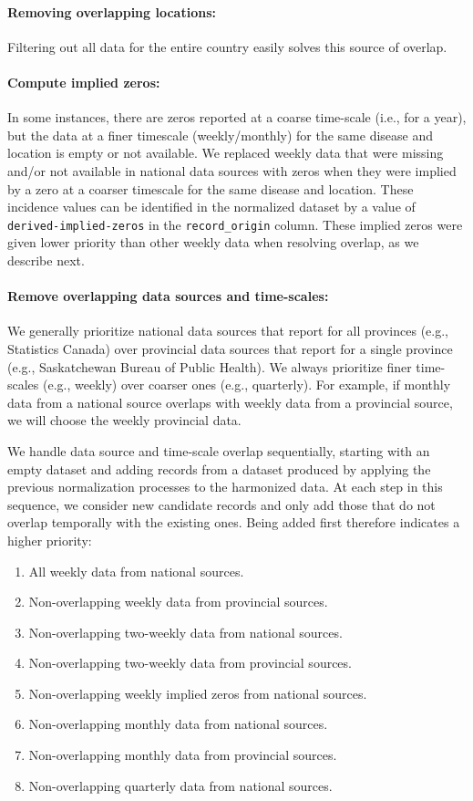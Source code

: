 \documentclass[12pt]{article}
\begin{document}
\paragraph{Removing overlapping locations:} Filtering out all data for the entire country easily solves this source of overlap.

\paragraph{Compute implied zeros:} In some instances, there are zeros reported at a coarse time-scale (i.e., for a year), but the data at a finer timescale (weekly/monthly) for the same disease and location is empty or not available. We replaced weekly data that were missing and/or not available in national data sources with zeros when they were implied by a zero at a coarser timescale for the same disease and location. These incidence values can be identified in the normalized dataset by a value of \texttt{derived-implied-zeros} in the \texttt{record\_origin} column. These implied zeros were given lower priority than other weekly data when resolving overlap, as we describe next.

\paragraph{Remove overlapping data sources and time-scales:} We generally prioritize national data sources that report for all provinces (e.g., Statistics Canada) over provincial data sources that report for a single province (e.g., Saskatchewan Bureau of Public Health). We always prioritize finer time-scales (e.g., weekly) over coarser ones (e.g., quarterly). For example, if monthly data from a national source overlaps with weekly data from a provincial source, we will choose the weekly provincial data.

We handle data source and time-scale overlap sequentially, starting with an empty dataset and adding records from a dataset produced by applying the previous normalization processes to the harmonized data. At each step in this sequence, we consider new candidate records and only add those that do not overlap temporally with the existing ones. Being added first therefore indicates a higher priority:
\begin{enumerate}
  \item All weekly data from national sources.
  \item Non-overlapping weekly data from provincial sources.
  \item Non-overlapping two-weekly data from national sources.
  \item Non-overlapping two-weekly data from provincial sources.
  \item Non-overlapping weekly implied zeros from national sources.
  \item Non-overlapping monthly data from national sources.
  \item Non-overlapping monthly data from provincial sources.
  \item Non-overlapping quarterly data from national sources.
\end{enumerate}
\end{document}
